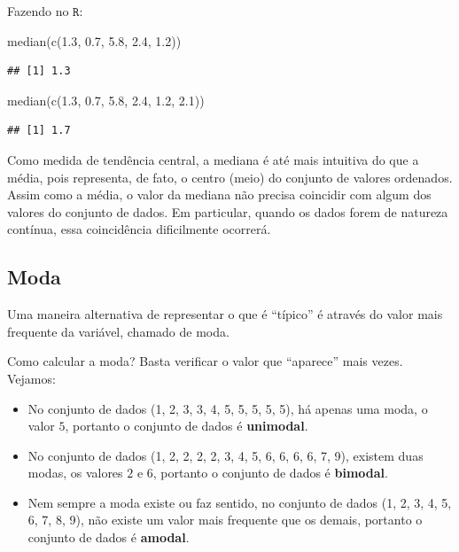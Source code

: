 \documentclass[
]{book}
\newenvironment{Shaded}{\begin{snugshade}}{\end{snugshade}}
\newcommand{\FloatTok}[1]{\textcolor[rgb]{0.00,0.00,0.81}{#1}}
\newcommand{\FunctionTok}[1]{\textcolor[rgb]{0.00,0.00,0.00}{#1}}
\newcommand{\NormalTok}[1]{#1}
\providecommand{\tightlist}{%
  \setlength{\itemsep}{0pt}\setlength{\parskip}{0pt}}
\begin{document}
Fazendo no \(\texttt{R}\):

\begin{Shaded}
\begin{Highlighting}[]
\FunctionTok{median}\NormalTok{(}\FunctionTok{c}\NormalTok{(}\FloatTok{1.3}\NormalTok{, }\FloatTok{0.7}\NormalTok{, }\FloatTok{5.8}\NormalTok{, }\FloatTok{2.4}\NormalTok{, }\FloatTok{1.2}\NormalTok{))}
\end{Highlighting}
\end{Shaded}

\begin{verbatim}
## [1] 1.3
\end{verbatim}

\begin{Shaded}
\begin{Highlighting}[]
\FunctionTok{median}\NormalTok{(}\FunctionTok{c}\NormalTok{(}\FloatTok{1.3}\NormalTok{, }\FloatTok{0.7}\NormalTok{, }\FloatTok{5.8}\NormalTok{, }\FloatTok{2.4}\NormalTok{, }\FloatTok{1.2}\NormalTok{, }\FloatTok{2.1}\NormalTok{))}
\end{Highlighting}
\end{Shaded}

\begin{verbatim}
## [1] 1.7
\end{verbatim}

Como medida de tendência central, a mediana é até mais intuitiva do que a média, pois representa, de fato, o centro (meio) do conjunto de valores ordenados. Assim como a média, o valor da mediana não precisa coincidir com algum dos valores do conjunto de dados. Em particular, quando os dados forem de natureza contínua, essa coincidência dificilmente ocorrerá.

\hypertarget{moda}{%
\subsection{Moda}\label{moda}}

Uma maneira alternativa de representar o que é ``típico'' é através do valor mais frequente da variável, chamado de moda.

Como calcular a moda? Basta verificar o valor que ``aparece'' mais vezes. Vejamos:

\begin{itemize}
\tightlist
\item
  No conjunto de dados (1, 2, 3, 3, 4, 5, 5, 5, 5, 5), há apenas uma moda, o valor \(5\), portanto o conjunto de dados é \textbf{unimodal}.
\item
  No conjunto de dados (1, 2, 2, 2, 2, 3, 4, 5, 6, 6, 6, 6, 7, 9), existem duas modas, os valores \(2\) e \(6\), portanto o conjunto de dados é \textbf{bimodal}.
\item
  Nem sempre a moda existe ou faz sentido, no conjunto de dados (1, 2, 3, 4, 5, 6, 7, 8, 9), não existe um valor mais frequente que os demais, portanto o conjunto de dados é \textbf{amodal}.
\end{itemize}
\end{document}

